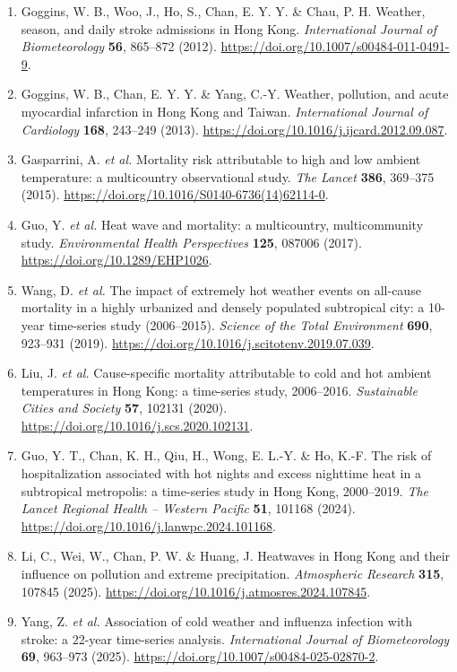 \documentclass[11pt,a4paper]{article}
\begin{document}
\begin{enumerate}[label=\arabic*.,leftmargin=1.8em,itemsep=0.45em]
\small
\item Goggins, W. B., Woo, J., Ho, S., Chan, E. Y. Y. \& Chau, P. H. Weather, season, and daily stroke admissions in Hong Kong. \emph{International Journal of Biometeorology} \textbf{56}, 865--872 (2012). \url{https://doi.org/10.1007/s00484-011-0491-9}.
\item Goggins, W. B., Chan, E. Y. Y. \& Yang, C.-Y. Weather, pollution, and acute myocardial infarction in Hong Kong and Taiwan. \emph{International Journal of Cardiology} \textbf{168}, 243--249 (2013). \url{https://doi.org/10.1016/j.ijcard.2012.09.087}.
\item Gasparrini, A. \emph{et al.} Mortality risk attributable to high and low ambient temperature: a multicountry observational study. \emph{The Lancet} \textbf{386}, 369--375 (2015). \url{https://doi.org/10.1016/S0140-6736(14)62114-0}.
\item Guo, Y. \emph{et al.} Heat wave and mortality: a multicountry, multicommunity study. \emph{Environmental Health Perspectives} \textbf{125}, 087006 (2017). \url{https://doi.org/10.1289/EHP1026}.
\item Wang, D. \emph{et al.} The impact of extremely hot weather events on all-cause mortality in a highly urbanized and densely populated subtropical city: a 10-year time-series study (2006--2015). \emph{Science of the Total Environment} \textbf{690}, 923--931 (2019). \url{https://doi.org/10.1016/j.scitotenv.2019.07.039}.
\item Liu, J. \emph{et al.} Cause-specific mortality attributable to cold and hot ambient temperatures in Hong Kong: a time-series study, 2006--2016. \emph{Sustainable Cities and Society} \textbf{57}, 102131 (2020). \url{https://doi.org/10.1016/j.scs.2020.102131}.
\item Guo, Y. T., Chan, K. H., Qiu, H., Wong, E. L.-Y. \& Ho, K.-F. The risk of hospitalization associated with hot nights and excess nighttime heat in a subtropical metropolis: a time-series study in Hong Kong, 2000--2019. \emph{The Lancet Regional Health -- Western Pacific} \textbf{51}, 101168 (2024). \url{https://doi.org/10.1016/j.lanwpc.2024.101168}.
\item Li, C., Wei, W., Chan, P. W. \& Huang, J. Heatwaves in Hong Kong and their influence on pollution and extreme precipitation. \emph{Atmospheric Research} \textbf{315}, 107845 (2025). \url{https://doi.org/10.1016/j.atmosres.2024.107845}.
\item Yang, Z. \emph{et al.} Association of cold weather and influenza infection with stroke: a 22-year time-series analysis. \emph{International Journal of Biometeorology} \textbf{69}, 963--973 (2025). \url{https://doi.org/10.1007/s00484-025-02870-2}.

\end{enumerate}
\end{document}
